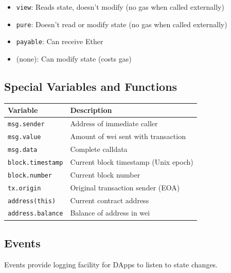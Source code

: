 \documentclass[11pt,a4paper]{article}
\begin{document}
\begin{itemize}
  \item \texttt{view}: Reads state, doesn't modify (no gas when called externally)
  \item \texttt{pure}: Doesn't read or modify state (no gas when called externally)
  \item \texttt{payable}: Can receive Ether
  \item (none): Can modify state (costs gas)
\end{itemize}

\subsection{Special Variables and Functions}

\begin{center}
\begin{tabular}{|l|p{7cm}|}
\hline
\textbf{Variable} & \textbf{Description} \\
\hline
\texttt{msg.sender} & Address of immediate caller \\
\texttt{msg.value} & Amount of wei sent with transaction \\
\texttt{msg.data} & Complete calldata \\
\texttt{block.timestamp} & Current block timestamp (Unix epoch) \\
\texttt{block.number} & Current block number \\
\texttt{tx.origin} & Original transaction sender (EOA) \\
\texttt{address(this)} & Current contract address \\
\texttt{address.balance} & Balance of address in wei \\
\hline
\end{tabular}
\end{center}

\subsection{Events}

Events provide logging facility for DApps to listen to state changes.
\end{document}
